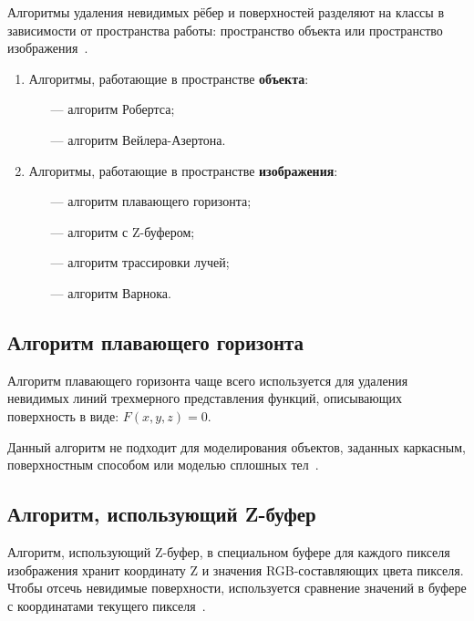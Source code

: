 Алгоритмы удаления невидимых рёбер и поверхностей разделяют на классы в зависимости от пространства работы: пространство объекта или пространство изображения~\cite{rodjers, geom}.

\begin{enumerate}
	\item Алгоритмы, работающие в пространстве \textbf{объекта}: 
		\begin{itemize}
			\item[---] алгоритм Робертса;
			\item[---] алгоритм Вейлера-Азертона.
		\end{itemize}
	\item Алгоритмы, работающие в пространстве \textbf{изображения}: 
		\begin{itemize}
			\item[---] алгоритм плавающего горизонта;
			\item[---] алгоритм с Z-буфером;
			\item[---] алгоритм трассировки лучей;
			\item[---] алгоритм Варнока.
		\end{itemize}
\end{enumerate}

\subsection{Алгоритм плавающего горизонта}

Алгоритм плавающего горизонта чаще всего используется для удаления невидимых линий трехмерного представления функций, описывающих поверхность в виде: $F(x, y, z) = 0$.

Данный алгоритм не подходит для моделирования объектов, заданных каркасным, поверхностным способом или моделью сплошных тел~\cite{geom}.

\subsection{Алгоритм, использующий Z-буфер}

Алгоритм, использующий Z-буфер, в специальном буфере для каждого пикселя изображения хранит координату Z и значения RGB-составляющих цвета пикселя. Чтобы отсечь невидимые поверхности, используется сравнение значений в буфере с координатами текущего пикселя~\cite{rodjers}.

